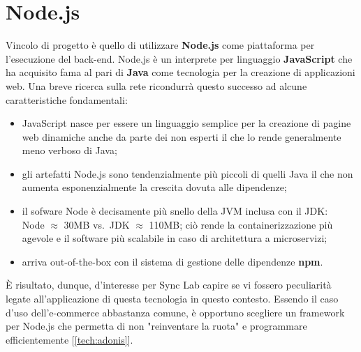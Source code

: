 \newpage

\section{Node.js}
Vincolo di progetto è quello di utilizzare \textbf{Node.js} come piattaforma per l'esecuzione del back-end. Node.js è un interprete per linguaggio \textbf{JavaScript} che ha acquisito fama al pari di \textbf{Java} come tecnologia per la creazione di applicazioni web. Una breve ricerca sulla rete ricondurrà questo successo ad alcune caratteristiche fondamentali:
\begin{itemize}
    \item JavaScript nasce per essere un linguaggio semplice per la creazione di pagine web dinamiche anche da parte dei non esperti il che lo rende generalmente meno verboso di Java;
    \item gli artefatti Node.js sono tendenzialmente più piccoli di quelli Java il che non aumenta esponenzialmente la crescita dovuta alle dipendenze;
    \item il sofware Node è decisamente più snello della JVM inclusa con il JDK:\\
    Node $\approx$ 30MB vs.\ JDK $\approx$ 110MB; ciò rende la containerizzazione più agevole e il software più scalabile in caso di architettura a microservizi;
    \item arriva out-of-the-box con il sistema di gestione delle dipendenze \textbf{npm}.
\end{itemize}
È risultato, dunque, d'interesse per Sync Lab capire se vi fossero peculiarità legate all'applicazione di questa tecnologia in questo contesto. Essendo il caso d'uso dell'e-commerce abbastanza comune, è opportuno scegliere un framework per Node.js che permetta di non "reinventare la ruota" e programmare efficientemente [\autoref{tech:adonis}].

